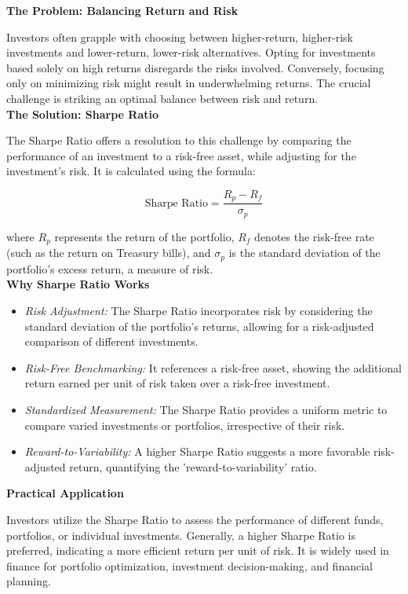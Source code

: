 \documentclass{article}
\begin{document}
\textbf{The Problem: Balancing Return and Risk}

Investors often grapple with choosing between higher-return, higher-risk investments and lower-return, lower-risk alternatives. Opting for investments based solely on high returns disregards the risks involved. Conversely, focusing only on minimizing risk might result in underwhelming returns. The crucial challenge is striking an optimal balance between risk and return. \\

\textbf{The Solution: Sharpe Ratio}

The Sharpe Ratio offers a resolution to this challenge by comparing the performance of an investment to a risk-free asset, while adjusting for the investment's risk. It is calculated using the formula:

\begin{equation}
    \text{Sharpe Ratio} = \frac{R_p - R_f}{\sigma_p}
\end{equation}

where \( R_p \) represents the return of the portfolio, \( R_f \) denotes the risk-free rate (such as the return on Treasury bills), and \( \sigma_p \) is the standard deviation of the portfolio's excess return, a measure of risk. \\

\textbf{Why Sharpe Ratio Works}

\begin{itemize}
    \item \textit{Risk Adjustment:} The Sharpe Ratio incorporates risk by considering the standard deviation of the portfolio’s returns, allowing for a risk-adjusted comparison of different investments.
    \item \textit{Risk-Free Benchmarking:} It references a risk-free asset, showing the additional return earned per unit of risk taken over a risk-free investment.
    \item \textit{Standardized Measurement:} The Sharpe Ratio provides a uniform metric to compare varied investments or portfolios, irrespective of their risk.
    \item \textit{Reward-to-Variability:} A higher Sharpe Ratio suggests a more favorable risk-adjusted return, quantifying the 'reward-to-variability' ratio.
\end{itemize}

\textbf{Practical Application}

Investors utilize the Sharpe Ratio to assess the performance of different funds, portfolios, or individual investments. Generally, a higher Sharpe Ratio is preferred, indicating a more efficient return per unit of risk. It is widely used in finance for portfolio optimization, investment decision-making, and financial planning. \\
\end{document}
